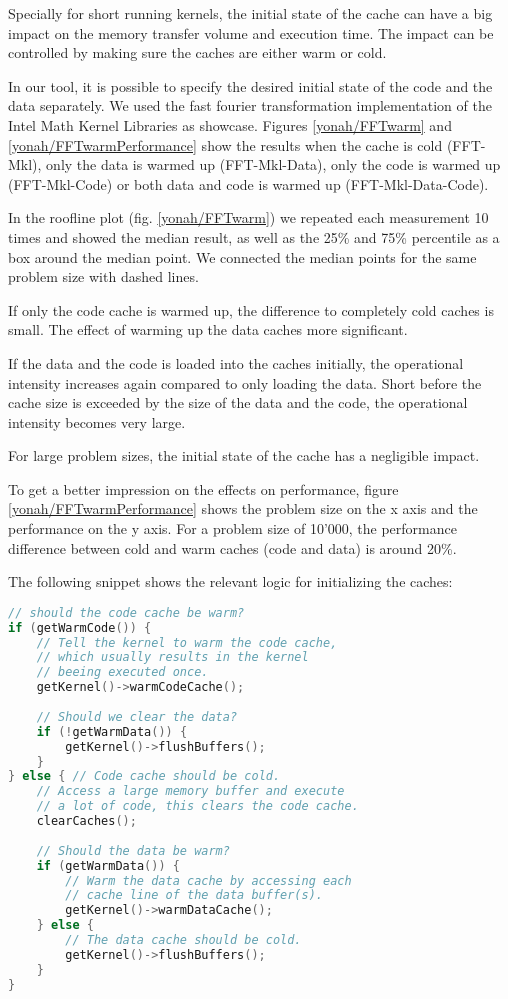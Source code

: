 \documentclass[a4paper,12pt]{report}
\begin{document}
Specially for short running kernels, the initial state of the cache can have a
big impact on the memory transfer volume and execution time.  The impact can be
controlled by making sure the caches are either warm or cold.

In our tool, it is possible to specify the desired initial state of the code and
the data separately. We used the fast fourier transformation implementation of
the Intel Math Kernel Libraries as showcase. Figures \ref{yonah/FFTwarm} and
\ref{yonah/FFTwarmPerformance} show the results when the cache is cold
(FFT-Mkl), only the data is warmed up (FFT-Mkl-Data), only the code is warmed up
(FFT-Mkl-Code) or both data and code is warmed up (FFT-Mkl-Data-Code).

In the roofline plot (fig. \ref{yonah/FFTwarm}) we repeated each measurement
10 times and showed the median result, as well as the 25\% and 75\% percentile
as a box around the median point. We connected the median points for the same
problem size with dashed lines.

If only the code cache is warmed up, the difference to completely cold caches
is small. The effect of warming up the data caches more significant. 

If the data and the code is loaded into the caches initially, the operational
intensity increases again compared to only loading the data.  Short before the
cache size is exceeded by the size of the data and the code, the operational
intensity becomes very large.

For large problem sizes, the initial state of the cache has a negligible
impact.

To get a better impression on the effects on performance, figure 
\ref{yonah/FFTwarmPerformance} shows the problem size on the x axis and the
performance on the y axis. For a problem size of 10'000, the performance
difference between cold and warm caches (code and data) is around 20\%.


The following snippet shows the relevant logic for initializing the caches:

\begin{lstlisting}[language=C++]
// should the code cache be warm?
if (getWarmCode()) {
	// Tell the kernel to warm the code cache,  
	// which usually results in the kernel 
	// beeing executed once.
	getKernel()->warmCodeCache(); 
	
	// Should we clear the data?
	if (!getWarmData()) {
		getKernel()->flushBuffers();
	}
} else { // Code cache should be cold.
	// Access a large memory buffer and execute  
	// a lot of code, this clears the code cache.
	clearCaches();
	
	// Should the data be warm?
	if (getWarmData()) {
		// Warm the data cache by accessing each 
		// cache line of the data buffer(s).
		getKernel()->warmDataCache();
	} else {
		// The data cache should be cold. 
		getKernel()->flushBuffers();
	}
} 
\end{lstlisting}
\end{document}
